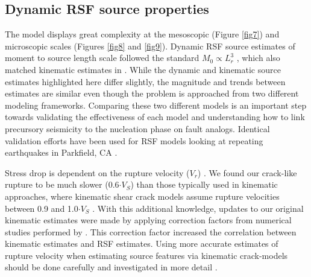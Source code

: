 \documentclass[preprint,1p, 10pt,authoryear]{elsarticle}
\begin{document}
\subsection{Dynamic RSF source properties}

The model displays great complexity at the mesoscopic (Figure \ref{fig7}) and microscopic scales (Figures \ref{fig8} and \ref{fig9}). Dynamic RSF source estimates of moment to source length scale followed the standard $M_{0} \propto L^{3}_{r}$ , which also matched kinematic estimates in \citet{Selvadurai2019}. While the dynamic and kinematic source estimates highlighted here differ slightly, the magnitude and trends between estimates are similar even though the problem is approached from two different modeling frameworks. Comparing these two different models is an important step towards validating the effectiveness of each model and understanding how to link precursory seismicity to the nucleation phase on fault analogs. Identical validation efforts have been used for RSF models looking at repeating earthquakes in Parkfield, CA \citep{Chen2009}.

Stress drop is dependent on the rupture velocity ($V_{r}$) \citep{Kaneko2015}. We found our crack-like rupture to be much slower (0.6$\cdot V_{S}$) than those typically used in kinematic approaches, where kinematic shear crack models assume rupture velocities between 0.9 and 1.0$\cdot V_{S}$ \citep{Cocco2016, Selvadurai2019}. With this additional knowledge, updates to our original kinematic estimates were made by applying correction factors from numerical studies performed by \citet{Kaneko2015}. This correction factor increased the correlation between kinematic estimates and RSF estimates. Using more accurate estimates of rupture velocity when estimating source features via kinematic crack-models should be done carefully and investigated in more detail \citep[e.g.][]{McGuire2018}.
\end{document}
